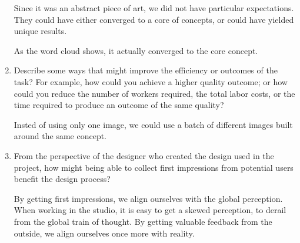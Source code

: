 \documentclass{article}
\begin{document}
\begin{enumerate}
Since it was an abstract piece of art, we did not have particular expectations. They could have either converged to a core of concepts, or could have yielded unique results.

As the word cloud shows, it actually converged to the core concept.

\item Describe some ways that might improve the efficiency or outcomes of the task? For example, how could you achieve a higher quality outcome; or how could you reduce the number of workers required, the total labor costs, or the time required to produce an outcome of the same quality?

Insted of using only one image, we could use a batch of different images built around the same concept.

\item From the perspective of the designer who created the design used in the project, how might being able to collect first impressions from potential users benefit the design process?

By getting first impressions, we align ourselves with the global perception. When working in the studio, it is easy to get a skewed perception, to derail from the global train of thought. By getting valuable feedback from the outside, we align ourselves once more with reality.

\end{enumerate}
\end{document}
